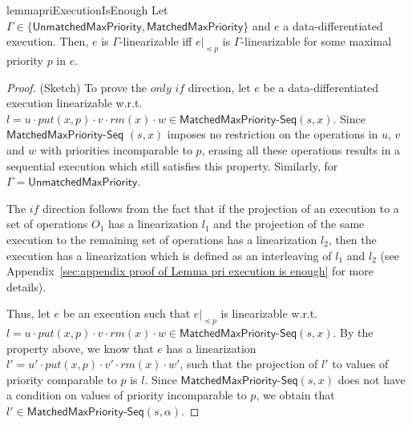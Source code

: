 \begin{restatable}{lemma}{priExecutionIsEnough}
\label{lemma:pri execution is enough}
Let $\Gamma\in \{\mathsf{UnmatchedMaxPriority}, \mathsf{MatchedMaxPriority}\}$ and $e$ a data-differentiated execution. Then, $e$ is $\Gamma$-linearizable iff $e\vert_{\preceq p}$ is $\Gamma$-linearizable for some maximal priority $p$ in $e$.
\end{restatable}
\begin {proof} (Sketch)
To prove the $\textit{only if}$ direction, let $e$ be a data-differentiated execution linearizable w.r.t. $l = u \cdot \textit{put}(x,p) \cdot v \cdot \textit{rm}(x) \cdot w \in \mathsf{MatchedMaxPriority}\mathsf{\text{-}Seq}(s,x)$. Since $\mathsf{MatchedMaxPriority}\mathsf{\text{-}Seq}$ $(s,x)$ imposes no restriction on the operations in $u$, $v$ and $w$ with priorities incomparable to $p$, erasing all these operations results in a sequential execution which still satisfies this property. Similarly, for $\Gamma=\mathsf{UnmatchedMaxPriority}$.

The $\textit{if}$ direction follows from the fact that if the projection of an execution to a set of operations $O_1$ has a linearization $l_1$ and the projection of the same execution to the remaining set of operations has a linearization $l_2$, then the execution has a linearization which is defined as an interleaving of $l_1$ and $l_2$ (see Appendix~\ref{sec:appendix proof of Lemma pri execution is enough} for more details).

Thus, let $e$ be an execution such that $e\vert_{\preceq p}$ is linearizable w.r.t. $l = u \cdot \textit{put}(x,p) \cdot v \cdot \textit{rm}(x) \cdot w \in \mathsf{MatchedMaxPriority}\mathsf{\text{-}Seq}(s,x)$. By the property above, we know that $e$ has a linearization $l' = u' \cdot \textit{put}(x,p) \cdot v' \cdot \textit{rm}(x) \cdot w'$, such that the projection of $l'$ to values of priority comparable to $p$ is $l$.
Since $\mathsf{MatchedMaxPriority}\mathsf{\text{-}Seq}(s,x)$ does not have a condition on values of priority incomparable to $p$, we obtain that $l' \in \mathsf{MatchedMaxPriority}\mathsf{\text{-}Seq}(s,\alpha)$.
\end {proof}

